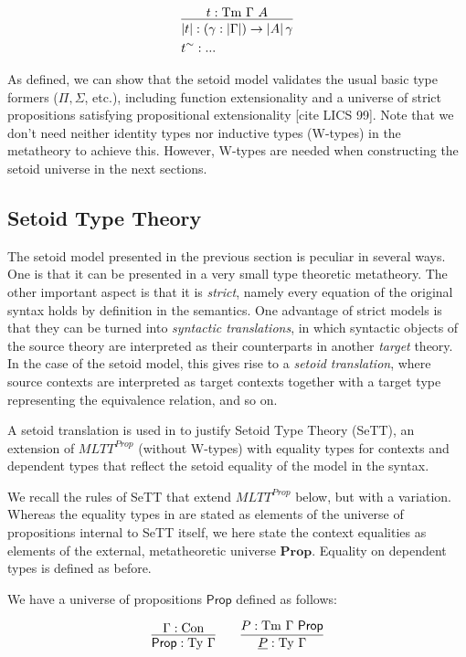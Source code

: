 \documentclass{easychair}
\newcommand{\GG}{\Gamma}
\newcommand{\Prop}{\textsf{Prop}}
\newcommand{\mProp}{\mathbf{Prop}}
\newcommand{\Con}{\mathrm{Con}}
\newcommand{\Ty}{\mathrm{Ty}}
\newcommand{\Tm}{\mathrm{Tm}}
\begin{document}
\[
\infer{
  \begin{aligned}
    & | t | : (\gamma : | \GG |) \to | A | \, \gamma \\
    & t^\sim : ...
  \end{aligned}
}{
  t : \Tm\ \GG\ A
}
\]

As defined, we can show that the setoid model validates the usual basic type
formers ($\Pi, \Sigma$, etc.), including function extensionality and a universe
of strict propositions satisfying propositional extensionality [cite LICS
  99]. Note that we don't need neither identity types nor inductive types
(W-types) in the metatheory to achieve this. However, W-types are needed when
constructing the setoid universe in the next sections.

\subsection{Setoid Type Theory}

The setoid model presented in the previous section is peculiar in several
ways. One is that it can be presented in a very small type theoretic
metatheory. The other important aspect is that it is \emph{strict}, namely every
equation of the original syntax holds by definition in the semantics. One
advantage of strict models is that they can be turned into \emph{syntactic
  translations}, in which syntactic objects of the source theory are interpreted
as their counterparts in another \emph{target} theory. In the case of the setoid
model, this gives rise to a \emph{setoid translation}, where source contexts are
interpreted as target contexts together with a target type representing the
equivalence relation, and so on.

A setoid translation is used in \cite{mpc19} to justify Setoid Type Theory
(SeTT), an extension of $MLTT^{Prop}$ (without W-types) with equality types for
contexts and dependent types that reflect the setoid equality of the model in
the syntax.

We recall the rules of SeTT that extend $MLTT^{Prop}$ below, but with a
variation. Whereas the equality types in \cite{mpc19} are stated as elements of
the universe of propositions internal to SeTT itself, we here state the context
equalities as elements of the external, metatheoretic universe
$\mProp$. Equality on dependent types is defined as before.

We have a universe of propositions $\Prop$ defined as follows:

\[
\infer{
  \Prop : \Ty\ \GG
}{
  \GG : \Con
}
\qquad
\infer{
  \underline{P} : \Ty\ \GG
}{
  P : \Tm\ \GG\ \Prop
}
\]
\end{document}
